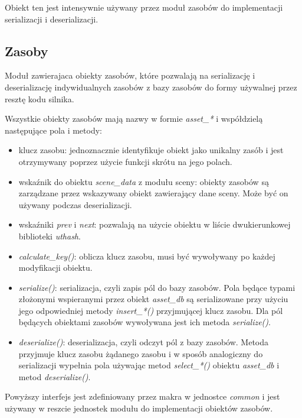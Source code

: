 Obiekt ten jest intensywnie używany przez moduł zasobów do implementacji serializacji i deserializacji.

\subsection{Zasoby}

Moduł zawierajaca obiekty zasobów, które pozwalają na serializację i deserializację indywidualnych zasobów z bazy zasobów do formy używalnej przez resztę kodu silnika.

Wszystkie obiekty zasobów mają nazwy w formie \textit{asset\_*} i współdzielą następujące pola i metody:
\begin{itemize}
	\item klucz zasobu: jednoznacznie identyfikuje obiekt jako unikalny zasób i jest otrzymywany poprzez użycie funkcji skrótu na jego polach.
	\item wskaźnik do obiektu \textit{scene\_data} z modułu sceny: obiekty zasobów są zarządzane przez wskazywany obiekt zawierający dane sceny. Może być on używany podczas deserializacji.
	\item wskaźniki \textit{prev} i \textit{next}: pozwalają na użycie obiektu w liście dwukierunkowej biblioteki \textit{uthash}.
	\item \textit{calculate\_key()}: oblicza klucz zasobu, musi być wywoływany po każdej modyfikacji obiektu.
	\item \textit{serialize()}: serializacja, czyli zapis pól do bazy zasobów.
	Pola będące typami złożonymi wspieranymi przez obiekt \textit{asset\_db} są serializowane przy użyciu jego odpowiedniej metody \textit{insert\_*()} przyjmującej klucz zasobu.
	Dla pól będących obiektami zasobów wywoływana jest ich metoda \textit{serialize()}.
	\item \textit{deserialize()}: deserializacja, czyli odczyt pól z bazy zasobów.
	Metoda przyjmuje klucz zasobu żądanego zasobu i w sposób analogiczny do serializacji wypełnia pola używając metod \textit{select\_*()} obiektu \textit{asset\_db} i metod \textit{deserialize()}.
\end{itemize}
Powyższy interfejs jest zdefiniowany przez makra w jednostce \textit{common} i jest używany w reszcie jednostek modułu do implementacji obiektów zasobów.

